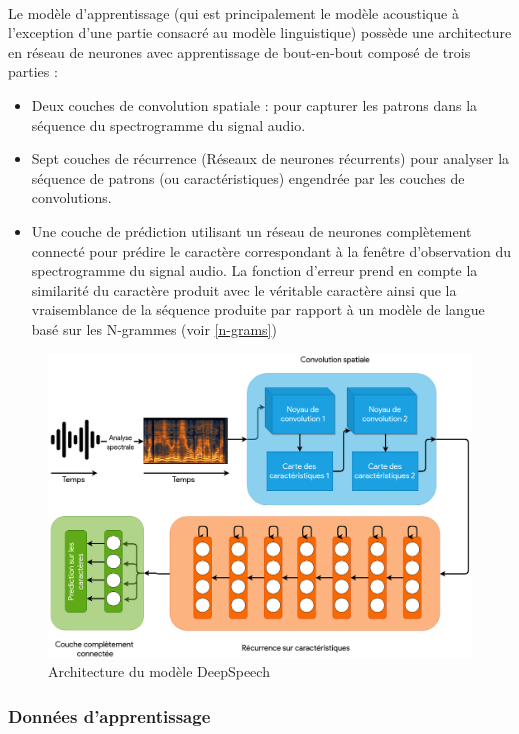 		\paragraph{}
		Le modèle d'apprentissage (qui est principalement le modèle acoustique à l'exception d'une partie consacré au modèle linguistique) possède une architecture en réseau de neurones avec apprentissage de bout-en-bout composé de trois parties : 
		\begin{itemize}
			\item Deux couches de convolution spatiale : pour capturer les patrons dans la séquence du spectrogramme du signal audio.
			\item Sept couches de récurrence (Réseaux de neurones récurrents) pour analyser la séquence de patrons (ou caractéristiques) engendrée par les couches de convolutions. 
			\item Une couche de prédiction utilisant un réseau de neurones complètement connecté pour prédire le caractère correspondant à la fenêtre d'observation du spectrogramme du signal audio. La fonction d'erreur prend en compte la similarité du caractère produit avec le véritable caractère ainsi que la vraisemblance de la séquence produite par rapport à un modèle de langue basé sur les N-grammes (voir \ref{n-grams})
		\end{itemize}
		\begin{figure}[H] 
			\centering
			\includegraphics[width=0.88\linewidth]{images/Conception/ASR/deeps_speech_arch.png}
			\caption{Architecture du modèle DeepSpeech \citep{deepspeech_paper}}
			\label{fig:deepSpeechArch}
			
		\end{figure}
		\subsubsection*{Données d'apprentissage}
		\label{common_voice}
